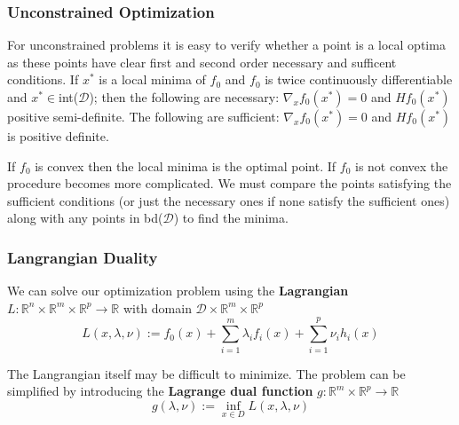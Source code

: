 \documentclass[]{article}
\theoremstyle{mattstyle}
\theoremstyle{definition}
\begin{document}
\subsubsection{Unconstrained Optimization}

For unconstrained problems it is easy to verify whether a point is a local optima as these points have clear first and second order necessary and sufficent conditions. If $x^*$ is a local minima of $f_0$ and $f_0$ is twice continuously differentiable and $x^* \in$int($\mathcal{D}$); then the following are necessary:
$\nabla_{x}f_0(x^*)=0$ and $Hf_{0}(x^*)$ positive semi-definite. The following are sufficient: $\nabla_{x}f_0(x^*)=0$ and $Hf_{0}(x^*)$ is positive definite.

If $f_0$ is convex then the local minima is the optimal point. If $f_0$ is not convex the procedure becomes more complicated. We must compare the points satisfying the sufficient conditions (or just the necessary ones if none satisfy the sufficient ones) along with any points in bd($\mathcal{D}$) to find the minima.

\subsubsection{Langrangian Duality}
We can solve our optimization problem using the \textbf{Lagrangian} $L: \mathbb{R}^n\times \mathbb{R}^m\times \mathbb{R}^p \rightarrow \mathbb{R} $ with domain $\mathcal{D}\times\mathbb{R}^m\times \mathbb{R}^p$
\begin{equation}\label{eq:primal}
L(x,\lambda,\nu) := f_0(x) + \sum_{i=1}^m \lambda_if_i(x) + \sum_{i=1}^p \nu_i h_i(x)
\end{equation}

The Langrangian itself may be difficult to minimize. The problem can be simplified by introducing the \textbf{Lagrange dual function} $g: \mathbb{R}^m\times \mathbb{R}^p \rightarrow \mathbb{R}$
\begin{equation}\label{eq:dual}
g(\lambda,\nu) :=\inf\limits_{x\in D} L(x,\lambda,\nu)
\end{equation}
\end{document}

